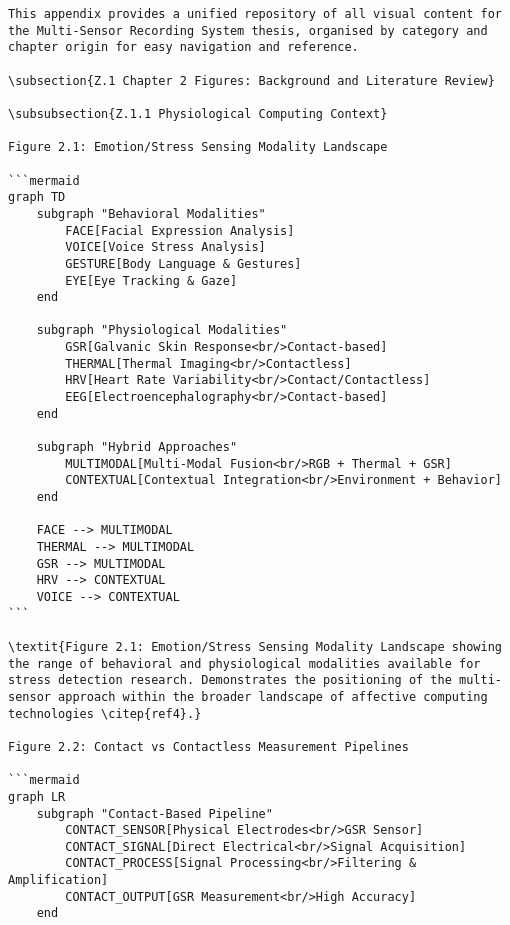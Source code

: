 \begin{verbatim}
This appendix provides a unified repository of all visual content for the Multi-Sensor Recording System thesis, organised by category and chapter origin for easy navigation and reference.

\subsection{Z.1 Chapter 2 Figures: Background and Literature Review}

\subsubsection{Z.1.1 Physiological Computing Context}

Figure 2.1: Emotion/Stress Sensing Modality Landscape

```mermaid
graph TD
    subgraph "Behavioral Modalities"
        FACE[Facial Expression Analysis]
        VOICE[Voice Stress Analysis]
        GESTURE[Body Language & Gestures]
        EYE[Eye Tracking & Gaze]
    end

    subgraph "Physiological Modalities"
        GSR[Galvanic Skin Response<br/>Contact-based]
        THERMAL[Thermal Imaging<br/>Contactless]
        HRV[Heart Rate Variability<br/>Contact/Contactless]
        EEG[Electroencephalography<br/>Contact-based]
    end

    subgraph "Hybrid Approaches"
        MULTIMODAL[Multi-Modal Fusion<br/>RGB + Thermal + GSR]
        CONTEXTUAL[Contextual Integration<br/>Environment + Behavior]
    end

    FACE --> MULTIMODAL
    THERMAL --> MULTIMODAL
    GSR --> MULTIMODAL
    HRV --> CONTEXTUAL
    VOICE --> CONTEXTUAL
```

\textit{Figure 2.1: Emotion/Stress Sensing Modality Landscape showing the range of behavioral and physiological modalities available for stress detection research. Demonstrates the positioning of the multi-sensor approach within the broader landscape of affective computing technologies \citep{ref4}.}

Figure 2.2: Contact vs Contactless Measurement Pipelines

```mermaid
graph LR
    subgraph "Contact-Based Pipeline"
        CONTACT_SENSOR[Physical Electrodes<br/>GSR Sensor]
        CONTACT_SIGNAL[Direct Electrical<br/>Signal Acquisition]
        CONTACT_PROCESS[Signal Processing<br/>Filtering & Amplification]
        CONTACT_OUTPUT[GSR Measurement<br/>High Accuracy]
    end


\end{verbatim}

